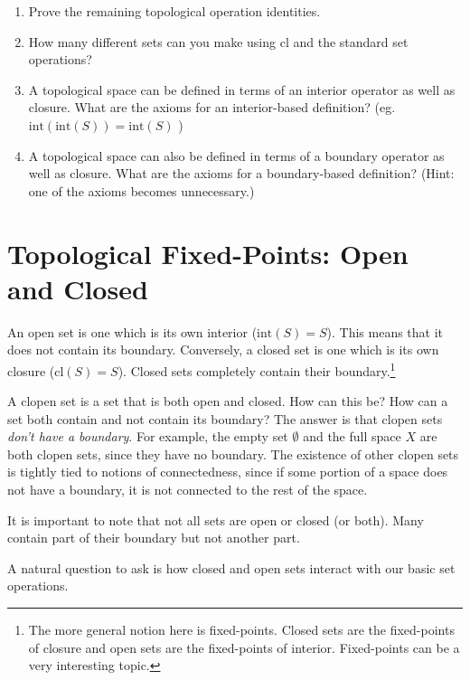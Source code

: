 \documentclass{report}
\newcommand{\cl}{\mathrm{cl}}
\newcommand{\intr}{\mathrm{int}}
\begin{document}
\begin{enumerate}

\item Prove the remaining topological operation identities.

\item How many different sets can you make using $\cl$ and the standard set operations? %

\item A topological space can be defined in terms of an interior operator as well as closure. What are the axioms for an interior-based definition? (eg. $\intr(\intr(S)) = \intr(S)$ )

\item A topological space can also be defined in terms of a boundary operator as well as closure. What are the axioms for a boundary-based definition? (Hint: one of the axioms becomes unnecessary.)

\end{enumerate}

\section{Topological Fixed-Points: Open and Closed}

An open set is one which is its own interior ($\intr(S) = S$). This means that it does not contain its boundary. Conversely, a closed set is one which is its own closure ($\cl(S) = S$). Closed sets completely contain their boundary.\footnote{The more general notion here is fixed-points. Closed sets are the fixed-points of closure and open sets are the fixed-points of interior. Fixed-points can be a very interesting topic.}

A clopen set is a set that is both open and closed. How can this be? How can a set both contain and not contain its boundary? The answer is that clopen sets \emph{don't have a boundary}. For example, the empty set $∅$ and the full space $X$ are both clopen sets, since they have no boundary. The existence of other clopen sets is tightly tied to notions of connectedness, since if some portion of a space does not have a boundary, it is not connected to the rest of the space.

It is important to note that not all sets are open or closed (or both). Many contain part of their boundary but not another part.

A natural question to ask is how closed and open sets interact with our basic set operations.
\end{document}
